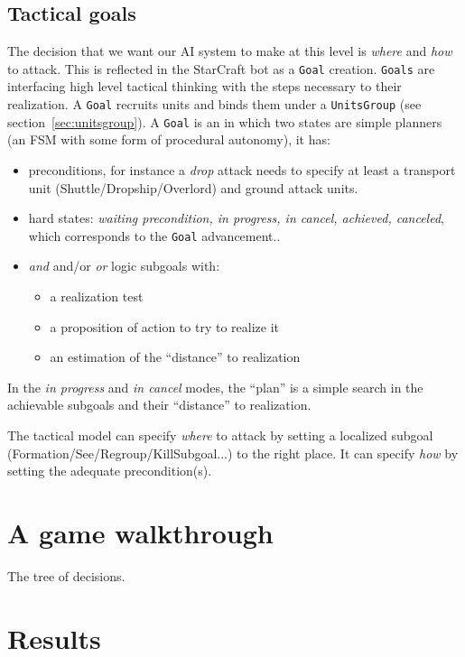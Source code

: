 \subsection{Tactical goals}
\label{sec:goals}
The decision that we want our AI system to make at this level is \textit{where} and \textit{how} to attack. This is reflected in the StarCraft bot as a \texttt{Goal} creation. \texttt{Goals} are interfacing high level tactical thinking with the steps necessary to their realization. A \texttt{Goal} recruits units and binds them under a \texttt{UnitsGroup} (see section~\ref{sec:unitsgroup}). A \texttt{Goal} is an  in which two states are simple planners (an FSM with some form of procedural autonomy), it has:
\begin{itemize}
    \item preconditions, for instance a \textit{drop} attack needs to specify at least a transport unit (Shuttle/Dropship/Overlord) and ground attack units.
    \item hard states: \textit{waiting precondition, in progress, in cancel, achieved, canceled}, which corresponds to the \texttt{Goal} advancement..
    \item \textit{and} and/or \textit{or} logic subgoals with:
        \begin{itemize}
            \item a realization test
            \item a proposition of action to try to realize it
            \item an estimation of the ``distance'' to realization
        \end{itemize}
\end{itemize}
In the \textit{in progress} and \textit{in cancel} modes, the ``plan'' is a simple search in the achievable subgoals and their ``distance'' to realization.

The tactical model can specify \textit{where} to attack by setting a localized subgoal (Formation/See/Regroup/KillSubgoal...) to the right place. It can specify \textit{how} by setting the adequate precondition(s).


\section{A game walkthrough}
The tree of decisions.


\section{Results}


